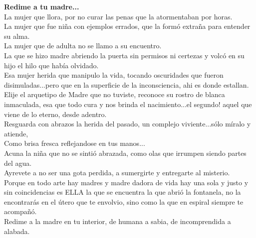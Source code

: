 \documentclass[12pt, a4paper, twoside]{book} %
\begin{document}
\noindent\textbf{Redime a tu madre...}\\
La mujer que llora, por no curar las penas que la atormentaban  por horas.\\
La mujer que fue niña con ejemplos errados, que la formó extraña para entender su alma.\\
La mujer que de adulta no se llamo a su encuentro.\\
La que se hizo madre abriendo la puerta sin permisos ni certezas y volcó en su hijo el hilo que había olvidado.\\
Esa mujer herida que manipulo la vida, tocando oscuridades que fueron disimuladas...pero que en la superficie de la inconsciencia, ahi es donde estallan.\\
Elije el arquetipo de Madre que no tuviste, reconoce su rostro de blanca inmaculada, esa que todo cura y nos brinda el nacimiento...el segundo! aquel que viene de lo eterno, desde adentro.\\
Resguarda con abrazos la herida del pasado, un complejo viviente...sólo míralo y atiende,\\
Como brisa fresca reflejandose en tus manos...\\
Acuna la niña que no se sintió abrazada, como olas que irrumpen siendo partes del agua.\\
Ayrevete  a no ser  una gota perdida, a sumergirte y entregarte al misterio.\\
Porque en todo arte hay madres y madre dadora de vida hay una sola y justo y sin coincidencias es ELLA la que se encuentra la que abrió la fontanela, no la encontrarás en el  útero que te envolvio, sino como  la que en espiral siempre te acompañó.\\
Redime a la madre en tu interior, de humana a sabia, de incomprendida a alabada.\\

\clearpage
\end{document}
